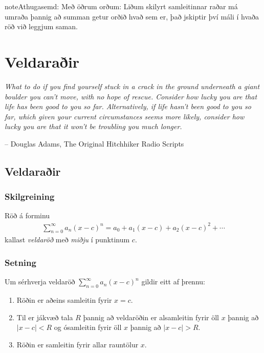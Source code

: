 \documentclass[a4paper,10pt,icelandic]{sphinxmanual}
\begin{document}
\begin{notice}{note}{Athugasemd:}
Með öðrum orðum:
Liðum skilyrt samleitinnar raðar má umraða þannig að summan getur orðið
hvað sem er, það jskiptir því máli í hvaða röð við leggjum saman.
\end{notice}


\chapter{Veldaraðir}
\label{kafli10:veldarair}\label{kafli10::doc}
\emph{What to do if you find yourself stuck in a crack in the ground underneath
a giant boulder you can't move, with no hope of rescue. Consider how lucky
you are that life has been good to you so far. Alternatively, if life hasn't
been good to you so far, which given your current circumstances seems more
likely, consider how lucky you are that it won't be troubling you much longer.}

-- Douglas Adams, The Original Hitchhiker Radio Scripts


\section{Veldaraðir}
\label{kafli10:id1}\label{kafli10:index-1}

\subsection{Skilgreining}
\label{kafli10:skilgreining}
Röð á forminu
\begin{equation*}
\begin{split}\sum_{n=0}^\infty a_n(x-c)^n=a_0+a_1(x-c)+a_2(x-c)^2+\cdots\end{split}
\end{equation*}
kallast \textit{veldaröð} með \textit{miðju} í punktinum \(c\).


\subsection{Setning}
\label{kafli10:setning-samleitnigeisli}\label{kafli10:setning}
Um sérhverja veldaröð \(\sum_{n=0}^\infty a_n(x-c)^n\) gildir eitt
af þrennu:
\begin{enumerate}
\item {} 
Röðin er aðeins samleitin fyrir \(x=c\).

\item {} 
Til er jákvæð tala \(R\) þannig að veldaröðin er alsamleitin
fyrir öll \(x\) þannig að \(|x-c|<R\) og ósamleitin fyrir
öll \(x\) þannig að \(|x-c|>R\).

\item {} 
Röðin er samleitin fyrir allar rauntölur \(x\).

\end{enumerate}
\end{document}

